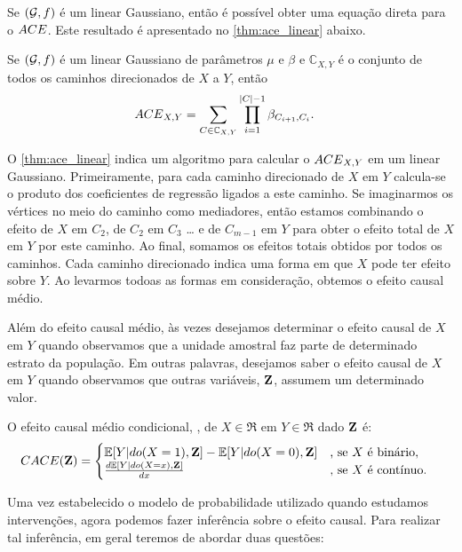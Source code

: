 Se $({\mathcal G},f)$ é um \CM linear Gaussiano, então é
possível obter uma equação direta para o ${ACE}$.
Este resultado é apresentado no \cref{thm:ace_linear} abaixo.

\begin{theorem}
 \label{thm:ace_linear}
 Se $({\mathcal G},f)$ é um \CM linear Gaussiano
 de parâmetros $\mu$ e $\beta$ e
 $\mathbb{C}_{X,Y}$ é o conjunto de
 todos os caminhos direcionados de $X$ a $Y$, então
 \begin{align*}
  {ACE}_{X,Y} &=
  \sum_{C \in \mathbb{C}_{X,Y}} \prod_{i=1}^{|C|-1} \beta_{C_{i+1},C_i}.
 \end{align*}
\end{theorem}

O \cref{thm:ace_linear} indica um algoritmo 
para calcular o ${ACE}_{X,Y}$ em um \CM linear Gaussiano.
Primeiramente, para cada caminho direcionado 
de $X$ em $Y$ calcula-se 
o produto dos coeficientes de regressão ligados a este caminho.
Se imaginarmos os vértices no meio do caminho como mediadores, então 
estamos combinando o efeito de $X$ em $C_{2}$, de $C_{2}$ em $C_{3}$ \ldots
e de $C_{m-1}$ em $Y$ para obter
o efeito total de $X$ em $Y$ por este caminho.
Ao final, somamos os efeitos totais obtidos por todos os caminhos.
Cada caminho direcionado indica uma forma em que $X$ pode ter efeito sobre $Y$.
Ao levarmos todoas as formas em consideração, 
obtemos o efeito causal médio.

Além do efeito causal médio, 
às vezes desejamos determinar 
o efeito causal de $X$ em $Y$ quando
observamos que a unidade amostral
faz parte de determinado estrato da população.
Em outras palavras, desejamos saber 
o efeito causal de $X$ em $Y$ quando observamos que
outras variáveis, ${\mathbf{Z}}$, assumem um determinado valor.

\begin{definition}
 \label{def:cace}
 O efeito causal médio condicional, \CACE,
 de $X \in \Re$ em $Y \in \Re$ dado ${\mathbf{Z}}$ é:
 \begin{align*}
  {CACE}({\mathbf{Z}}) &=
  \begin{cases}
   {\mathbb E}[Y|do(X=1),{\mathbf{Z}}] - {\mathbb E}[Y|do(X=0),{\mathbf{Z}}]
   & \text{, se $X$ é binário}, \\
   \frac{d{\mathbb E}[Y|do(X=x),{\mathbf{Z}}]}{dx}
   & \text{, se $X$ é contínuo}.
  \end{cases}
 \end{align*}
\end{definition}

Uma vez estabelecido o modelo de probabilidade
utilizado quando estudamos intervenções,
agora podemos fazer inferência sobre o efeito causal.
Para realizar tal inferência, 
em geral teremos de abordar duas questões:

